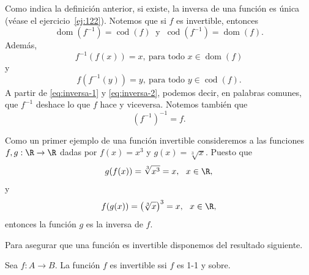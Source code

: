 \documentclass[12pt,a4paper]{book}
\DeclareMathOperator{\dom}{dom}
\DeclareMathOperator{\cod}{cod}
\begin{document}
    Como indica la definición anterior, si existe, la inversa de una función es
    única (véase el ejercicio~\ref{ej:122}). Notemos que si $f$ es invertible, entonces
    \begin{equation}\label{eq:inversa-dom}
        \dom\left(f^{-1}\right)=\cod(f)\ \text{ y }\ \cod\left(f^{-1}\right)=\dom(f).
    \end{equation}
    Además,
    \begin{equation}\label{eq:inversa-1}
        f^{-1}(f(x))=x,\ \text{para todo }x\in\dom(f)
    \end{equation}
    y
    \begin{equation}\label{eq:inversa-2}
        f\left(f^{-1}(y)\right)=y,\ \text{para todo }y\in\cod(f).
    \end{equation}
    A partir de \eqref{eq:inversa-1} y \eqref{eq:inversa-2}, podemos decir, en palabras comunes, que $f^{-1}$
    deshace lo que $f$ hace y viceversa. Notemos también que
    \begin{equation*}
        \left(f^{-1}\right)^{-1}=f.
    \end{equation*}

    Como un primer ejemplo de una función invertible consideremos a las
    funciones $f,g:\R\to\R$ dadas por $f(x)=x^{3}$ y $g(x)=\sqrt[3]{x}$. Puesto que
    \begin{equation*}
        g(f(x))=\sqrt[3]{x^{3}}=x,\ \ x\in\R,
    \end{equation*}
    y
    \begin{equation*}
        f(g(x))=\left(\sqrt[3]{x}\right)^{3}=x,\ \ x\in\R,
    \end{equation*}
    entonces la función $g$ es la inversa de $f$.

    Para asegurar que una función es invertible disponemos del resultado
    siguiente.

    \begin{proposicion}\label{prop:27}
        Sea $f:A\to B$. La función $f$ es invertible ssi $f$ es 1-1 y
        sobre.
    \end{proposicion}
\end{document}
